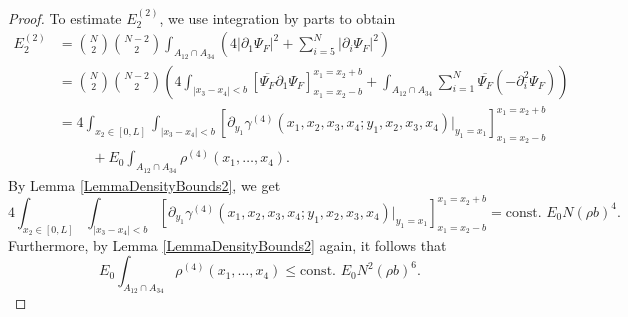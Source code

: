 \documentclass[a4paper,11pt]{article}
\newcommand{\abs}[1]{\left\lvert #1 \right\rvert}
\numberwithin{equation}{section}
\begin{document}
\begin{proof}
		To estimate $ E_2^{(2)} $, we use integration by parts to obtain \begin{equation}
		\begin{aligned}
		E_2^{(2)}&=\binom{N}{2}\binom{N-2}{2}\int_{A_{12}\cap A_{34}} \left(4\abs{\partial_1\Psi_F}^2+\sum_{i=5}^{N}\abs{\partial_i\Psi_F}^2\right)\\
		&=\binom{N}{2}\binom{N-2}{2}\left(4\int_{\abs{x_3-x_4}<b}\left[\overline{\Psi_F}\partial_1\Psi_F\right]_{x_1=x_2-b}^{x_1=x_2+b} +\int_{A_{12}\cap A_{34}} \sum_{i=1}^{N}\overline{\Psi_F}(-\partial^2_i\Psi_F)\right)\\
		&=4\int_{x_2\in[0,L]}\int_{\abs{x_3-x_4}<b}\left[\partial_{y_1}\gamma^{(4)}(x_1,x_2,x_3,x_4;y_1,x_2,x_3,x_4)\bigg\vert_{y_1=x_1}\right]_{x_1=x_2-b}^{x_1=x_2+b}\\&\hspace{1cm}+E_0\int_{A_{12}\cap A_{34}}\rho^{(4)}(x_1,\dots,x_4).
		\end{aligned}
		\end{equation}
		By Lemma \ref{LemmaDensityBounds2}, we get \begin{equation}
		4\int_{x_2\in[0,L]}\int_{\abs{x_3-x_4}<b}\left[\partial_{y_1}\gamma^{(4)}(x_1,x_2,x_3,x_4;y_1,x_2,x_3,x_4)\bigg\vert_{y_1=x_1}\right]_{x_1=x_2-b}^{x_1=x_2+b}=\text{const. }E_0 N (\rho b)^4.
		\end{equation}
		Furthermore, by Lemma \ref{LemmaDensityBounds2} again, it follows that \begin{equation}
		E_0\int_{A_{12}\cap A_{34}}\rho^{(4)}(x_1,\dots,x_4)\leq \text{const. } E_0 N^2(\rho b)^6.
		\end{equation}
	\end{proof}
	
\end{document}
